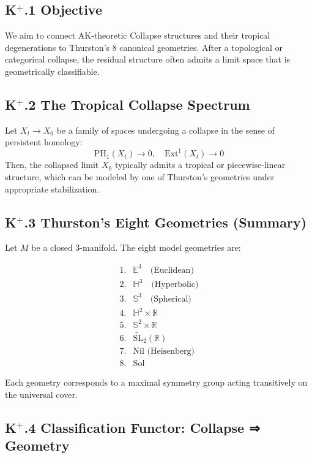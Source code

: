 \documentclass[11pt]{article}
\begin{document}
\begin{axiom}
\begin{axiom}
\subsection*{K$^+$.1 Objective}

We aim to connect AK-theoretic Collapse structures and their tropical degenerations  
to Thurston's 8 canonical geometries. After a topological or categorical collapse, the residual structure  
often admits a limit space that is geometrically classifiable.

\subsection*{K$^+$.2 The Tropical Collapse Spectrum}

Let \( X_t \to X_0 \) be a family of spaces undergoing a collapse in the sense of persistent homology:
\[
\mathrm{PH}_1(X_t) \to 0, \quad \mathrm{Ext}^1(X_t) \to 0
\]
Then, the collapsed limit \( X_0 \) typically admits a tropical or piecewise-linear structure,  
which can be modeled by one of Thurston's geometries under appropriate stabilization.

\subsection*{K$^+$.3 Thurston's Eight Geometries (Summary)}

Let \( M \) be a closed 3-manifold. The eight model geometries are:

\[
\begin{array}{ll}
1. & \mathbb{E}^3 \quad \text{(Euclidean)} \\
2. & \mathbb{H}^3 \quad \text{(Hyperbolic)} \\
3. & \mathbb{S}^3 \quad \text{(Spherical)} \\
4. & \mathbb{H}^2 \times \mathbb{R} \\
5. & \mathbb{S}^2 \times \mathbb{R} \\
6. & \widetilde{\mathrm{SL}}_2(\mathbb{R}) \\
7. & \text{Nil (Heisenberg)} \\
8. & \text{Sol}
\end{array}
\]

Each geometry corresponds to a maximal symmetry group acting transitively on the universal cover.

\subsection*{K$^+$.4 Classification Functor: Collapse ⇒ Geometry}


\end{axiom}
\end{axiom}
\end{document}
